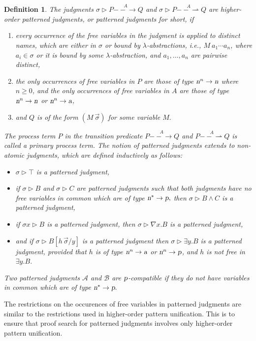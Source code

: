 \documentclass{acmtrans2m}
\newenvironment{definition}{\begin{define} \rm}{\end{define}}
\newtheorem{define}[theorem]{Definition}
\newcommand{\ie}{{\em i.e.}}
\def\Ascr{{\mathcal A}}
\def\Bscr{{\mathcal B}}
\newcommand{\Judg}[2]{#1\triangleright#2}
\newcommand{\action}{\hbox{\sl a}}
\newcommand{\name}{\hbox{\sl n}}
\newcommand{\one  }[3]{#1\stackrel{#2}{-\!\!-\!\!\!\rightarrow    } #3}
\newcommand{\onep }[3]{#1\stackrel{#2}{-\!\!-\!\!\!\rightharpoonup} #3}
\newcommand{\proc}{\hbox{\sl p}}
\newcommand{\ra}{\rightarrow}
\begin{document}
\begin{definition}
The judgments $\Judg{\sigma}{\one{P}{A}{Q}}$ and
$\Judg{\sigma}{\onep{P}{A}{Q}}$ are 
{\em higher-order patterned judgments}, or patterned judgments for short, if
\begin{enumerate}
\item every occurrence of the free variables in the judgment is applied
to distinct names, which are either in $\sigma$ or bound by $\lambda$-abstractions, \ie,
$M~a_1 \cdots a_n$, where $a_i \in \sigma$ or it is bound by some
$\lambda$-abstraction, and $a_1, \ldots, a_n$ are pairwise distinct,
\item the only occurrences of free variables in $P$ are those of type
$\name^n \ra \name$ where $n \geq 0$, and the only occurrences of 
free variables in $A$ are those of type 
$\name^n \ra \name$ or $\name^n \ra \action$,
\item and $Q$ is of the form $(M ~ \vec \sigma)$ for some variable $M.$ 
\end{enumerate}
The process term $P$ in the transition predicate $\one{P}{A}{Q}$ and 
$\onep{P}{A}{Q}$ is called a {\em primary} process term. 
The notion of patterned judgments extends to non-atomic judgments,
which are defined inductively as follows: 
\begin{itemize}
\item $\Judg{\sigma}{\top}$ is a patterned judgment,
\item if $\Judg{\sigma}{B}$ and $\Judg{\sigma}{C}$ are patterned judgments
such that both judgments have no free variables in common which are
of type $\name^* \ra \proc,$  then $\Judg{\sigma}{B \land C}$ is a patterned judgment, 
\item if $\Judg{\sigma x}{B}$ is a patterned judgment, then 
$\Judg{\sigma}{\nabla x.B}$ is a patterned judgment, 
\item and if $\Judg{\sigma}{B[h\,\vec \sigma/y]}$ is a patterned judgment
then $\Judg{\sigma}{\exists y.B}$ is a patterned judgment, provided that 
$h$ is of type $\name^n \ra \action$ or $\name^n \ra \proc$, and
$h$ is not free in $\exists y.B$. 
\end{itemize}
Two patterned judgments $\Ascr$ and $\Bscr$ are {\em $\proc$-compatible}
if they do not have variables in common which are of type $\name^* \ra \proc.$
\end{definition}
The restrictions on the occurences of free variables in 
patterned judgments are similar to the restrictions used in higher-order
pattern unification. This is to ensure that proof search for patterned judgments 
involves only higher-order pattern unification. 
\end{document}
